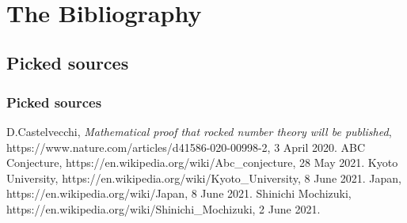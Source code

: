 \documentclass[9pt]{beamer}
\begin{document}
\begin{frame}
\begin{columns}
\begin{centering}
                    \end{centering}
                    \\\vspace{0.50cm}
            \end{columns}
        \end{frame}
        
    \section{The Bibliography}
    
        \subsection{Picked sources}
        \begin{frame}
            \frametitle{Picked sources}
            \begin{thebibliography}{XXX}
                D.Castelvecchi, \textit{Mathematical proof that rocked number theory will be published}, https://www.nature.com/articles/d41586-020-00998-2, 3 April 2020.
                ABC Conjecture, https://en.wikipedia.org/wiki/Abc\_conjecture, 28 May 2021.
                Kyoto University, https://en.wikipedia.org/wiki/Kyoto\_University, 8 June 2021.
                Japan, https://en.wikipedia.org/wiki/Japan, 8 June 2021.
                Shinichi Mochizuki, https://en.wikipedia.org/wiki/Shinichi\_Mochizuki, 2 June 2021.
            \end{thebibliography}
        \end{frame}
        
\end{document}
